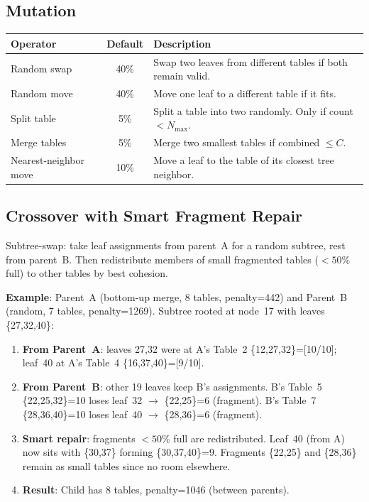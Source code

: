 \documentclass[11pt,a4paper]{article}
\begin{document}
\subsection{Mutation}

\begin{table}[H]
\centering
\begin{tabular}{lcp{8cm}}
\toprule
\textbf{Operator} & \textbf{Default} & \textbf{Description} \\
\midrule
Random swap & 40\% & Swap two leaves from different tables if both remain valid. \\
Random move & 40\% & Move one leaf to a different table if it fits. \\
Split table & 5\% & Split a table into two randomly.  Only if count $< N_{\max}$. \\
Merge tables & 5\% & Merge two smallest tables if combined $\leq C$. \\
Nearest-neighbor move & 10\% & Move a leaf to the table of its closest tree neighbor. \\
\bottomrule
\end{tabular}
\end{table}

\subsection{Crossover with Smart Fragment Repair}

Subtree-swap: take leaf assignments from parent~A for a random subtree, rest from parent~B.  Then redistribute members of small fragmented tables ($<50\%$ full) to other tables by best cohesion.

\textbf{Example}: Parent~A (bottom-up merge, 8 tables, penalty=442) and Parent~B (random, 7 tables, penalty=1269).  Subtree rooted at node~17 with leaves \{27,32,40\}:

\begin{enumerate}[nosep]
    \item \textbf{From Parent~A}: leaves 27,32 were at A's Table~2 \{12,27,32\}=[10/10]; leaf~40 at A's Table~4 \{16,37,40\}=[9/10].
    \item \textbf{From Parent~B}: other 19 leaves keep B's assignments.  B's Table~5 \{22,25,32\}=10 loses leaf~32 $\to$ \{22,25\}=6 (fragment).  B's Table~7 \{28,36,40\}=10 loses leaf~40 $\to$ \{28,36\}=6 (fragment).
    \item \textbf{Smart repair}: fragments $<50\%$ full are redistributed.  Leaf~40 (from A) now sits with \{30,37\} forming \{30,37,40\}=9.  Fragments \{22,25\} and \{28,36\} remain as small tables since no room elsewhere.
    \item \textbf{Result}: Child has 8 tables, penalty=1046 (between parents).
\end{enumerate}
\end{document}
